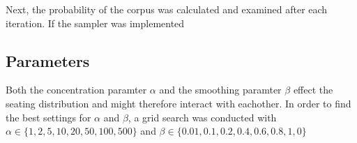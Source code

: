 Next, the probability of the corpus was calculated and examined after each iteration. If the sampler was implemented

\subsection{Parameters}
Both the concentration paramter $\alpha$ and the smoothing paramter $\beta$ effect the seating distribution and might therefore interact with eachother. In order to find the best settings for $\alpha$ and $\beta$, a grid search was conducted with $\alpha \in \{1, 2, 5, 10, 20, 50, 100, 500 \}$ and $\beta \in \{ 0.01, 0.1, 0.2, 0.4,0.6, 0.8, 1, 0 \}$
